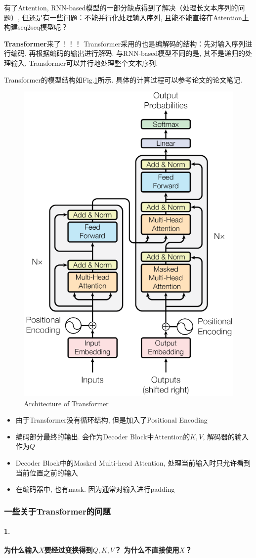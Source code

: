 有了Attention, RNN-based模型的一部分缺点得到了解决（处理长文本序列的问题）, 但还是有一些问题：不能并行化处理输入序列, 且能不能直接在Attention上构建seq2seq模型呢？

\textbf{Transformer}\cite{vaswani2017attention}来了！！！
Transformer采用的也是编解码的结构：先对输入序列进行编码, 再根据编码的输出进行解码. 与RNN-based模型不同的是, 其不是递归的处理输入, Transformer可以并行地处理整个文本序列.  

Transformer的模型结构如Fig.\ref{fig:transformer}所示. 具体的计算过程可以参考论文\cite{bivaswani2017attentionbid}的论文笔记. 
\begin{figure}[h] 
	\centering
	\includegraphics[width=.4\textwidth]{pics/Transformer.png}
	\caption{Architecture of Transformer}
	\label{fig:transformer}
\end{figure}

\begin{itemize}
	\item 由于Transformer没有循环结构, 但是加入了Positional Encoding
	\item 编码部分最终的输出. 会作为Decoder Block中Attention的$K, V$, 解码器的输入作为$Q$
	\item Decoder Block中的Masked Multi-head Attention, 处理当前输入时只允许看到当前位置之前的输入
	\item 在编码器中, 也有mask. 因为通常对输入进行padding
\end{itemize}

\subsubsection{一些关于Transformer的问题}
\paragraph{1.}{\textbf{为什么输入$X$要经过变换得到$Q, K, V$？ 为什么不直接使用$X$？}}


